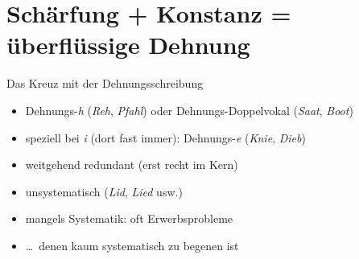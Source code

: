 \section{Schärfung + Konstanz = überflüssige Dehnung}

\begin{frame}
  {Das Kreuz mit der Dehnungsschreibung}
  \pause
  \begin{itemize}[<+->]
    \item Dehnungs-\textit{h} (\textit{Reh}, \textit{Pfahl}) oder Dehnungs-Doppelvokal (\textit{Saat}, \textit{Boot})
    \item speziell bei \textit{i} (dort fast immer): Dehnungs-\textit{e} (\textit{Knie}, \textit{Dieb})
      \Halbzeile
    \item \alert{weitgehend redundant} (erst recht im Kern)
    \item \alert{unsystematisch} (\textit{Lid}, \textit{Lied} usw.)
      \Halbzeile
    \item mangels Systematik: \alert{oft Erwerbsprobleme}
    \item \ldots\ denen kaum systematisch zu begenen ist
  \end{itemize}
\end{frame}

